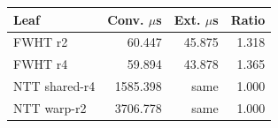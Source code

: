 \begingroup
\setlength{\tabcolsep}{3pt}
\begin{tabular}{@{}lrrr@{}}
\toprule
Leaf & Conv. $\mu$s & Ext. $\mu$s & Ratio\\\midrule
FWHT r2 & 60.447 & 45.875 & 1.318\\
FWHT r4 & 59.894 & 43.878 & 1.365\\
NTT shared-r4 & 1585.398 & same & 1.000\\
NTT warp-r2 & 3706.778 & same & 1.000\\
\bottomrule
\end{tabular}
\endgroup
